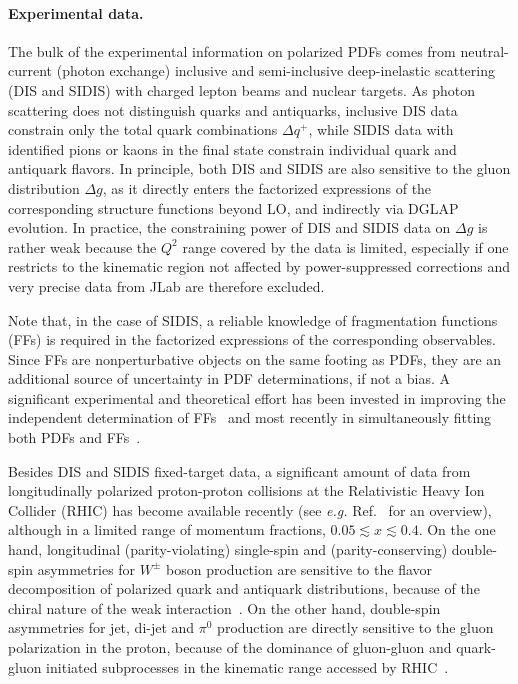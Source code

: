 \paragraph*{Experimental data.}
The bulk of the experimental information on polarized PDFs comes from 
neutral-current (photon exchange) inclusive and semi-inclusive deep-inelastic
scattering (DIS and SIDIS) with charged lepton beams and nuclear targets. 
%
As photon scattering does not distinguish quarks and antiquarks, inclusive DIS 
data constrain only the total quark combinations $\Delta q^+$, 
while SIDIS data with identified pions or kaons in the final state 
constrain individual quark and antiquark flavors. 
%
In principle, both DIS and SIDIS are also sensitive to the gluon 
distribution $\Delta g$, as it directly enters the factorized expressions of
the corresponding structure functions beyond LO, and indirectly via DGLAP 
evolution.
%
In practice, the constraining power of DIS and SIDIS data on $\Delta g$ is 
rather weak because the $Q^2$ range covered by the data is limited,
especially if one restricts to the kinematic region not affected by
power-suppressed corrections and very precise data from JLab are therefore
excluded. 

Note that, in the case of SIDIS, a reliable knowledge of fragmentation 
functions (FFs) is required in the factorized expressions of the 
corresponding observables. 
%
Since FFs are nonperturbative objects on the same footing as PDFs, they are 
an additional source of uncertainty in PDF determinations, if not a bias.
%
A significant experimental and theoretical effort has been
invested in improving the independent determination of 
FFs~\cite{deFlorian:2014xna,deFlorian:2017lwf,
Hirai:2016loo,Sato:2016wqj,Bertone:2017tyb} and most recently in simultaneously 
fitting both PDFs and FFs~\cite{Ethier:2017zbq}.

Besides DIS and SIDIS fixed-target data, a significant amount of data from
longitudinally polarized proton-proton collisions at the Relativistic 
Heavy Ion Collider (RHIC) has become available recently (see {\it e.g.} 
Ref.~\cite{Aschenauer:2015eha} for an overview), although in a limited range 
of momentum fractions, $0.05\lesssim x \lesssim 0.4$.
%
On the one hand, longitudinal (parity-violating) single-spin and 
(parity-conserving) double-spin asymmetries for $W^\pm$ boson production are 
sensitive to the flavor decomposition of polarized quark and antiquark 
distributions, because of the chiral nature of the weak 
interaction~\cite{Bourrely:1993dd}. 
%
On the other hand, double-spin asymmetries for jet, di-jet and $\pi^0$ 
production are directly sensitive to the gluon polarization in 
the proton, because of the dominance of gluon-gluon and quark-gluon initiated 
subprocesses in the kinematic range accessed by RHIC~\cite{Bourrely:1990pz}.

